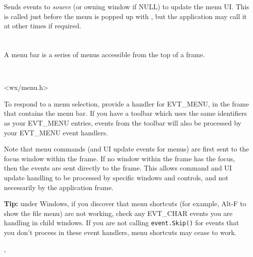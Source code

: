 
Sends events to {\it source} (or owning window if NULL) to update the
menu UI. This is called just before the menu is popped up with , but
the application may call it at other times if required.



\section{}\label{wxmenubar}

A menu bar is a series of menus accessible from the top of a frame.


\\


<wx/menu.h>


To respond to a menu selection, provide a handler for EVT\_MENU, in the frame
that contains the menu bar. If you have a toolbar which uses the same identifiers
as your EVT\_MENU entries, events from the toolbar will also be processed by your
EVT\_MENU event handlers.

Note that menu commands (and UI update events for menus) are first sent to
the focus window within the frame. If no window within the frame has the focus,
then the events are sent directly to the frame. This allows command and UI update
handling to be processed by specific windows and controls, and not necessarily
by the application frame.

{\bf Tip:} under Windows, if you discover that menu shortcuts (for example, Alt-F to show the file menu)
are not working, check any EVT\_CHAR events you are handling in child windows.
If you are not calling {\tt event.Skip()} for events that you don't process in these event handlers,
menu shortcuts may cease to work.


, 


